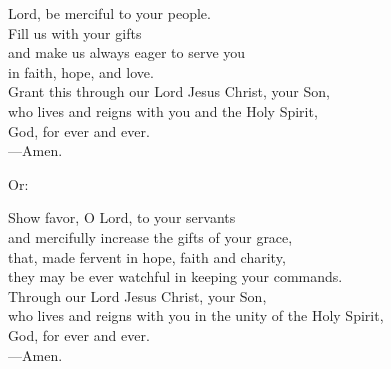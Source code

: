\prayer


\begin{prayerverse}
Lord, be merciful to your people.\\
Fill us with your gifts\\
and make us always eager to serve you\\
in faith, hope, and love.\\
Grant this through our Lord Jesus Christ, your Son,\\
who lives and reigns with you and the Holy Spirit,\\
God, for ever and ever.\\
{\color{red}---\thinspace}Amen.

{\color{red}Or:}

Show favor, O Lord, to your servants\\
and mercifully increase the gifts of your grace,\\
that, made fervent in hope, faith and charity,\\
they may be ever watchful in keeping your commands.\\
Through our Lord Jesus Christ, your Son,\\
who lives and reigns with you in the unity of the Holy Spirit,\\
God, for ever and ever.\\
{\color{red}---\thinspace}Amen.
\end{prayerverse}

